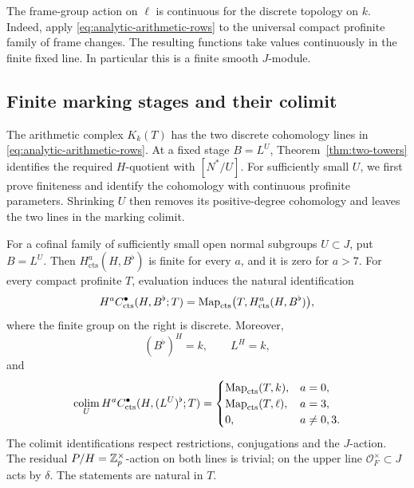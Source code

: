 The frame-group action on \(\ell\) is continuous for the discrete
topology on \(k\).  Indeed, apply
\eqref{eq:analytic-arithmetic-rows} to the universal compact
profinite family of frame changes.  The resulting functions take
values continuously in the finite fixed line.  In particular this
is a finite smooth \(J\)-module.

\subsection{Finite marking stages and their colimit}

The arithmetic complex $K_k(T)$ has the two discrete cohomology lines
in \eqref{eq:analytic-arithmetic-rows}.  At a fixed stage $B=L^U$,
Theorem~\ref{thm:two-towers} identifies the required $H$-quotient
with $[N^*/U]$.  For sufficiently small $U$, we first prove finiteness
and identify the cohomology with continuous profinite parameters.
Shrinking $U$ then removes its positive-degree cohomology and leaves
the two lines in the marking colimit.

\begin{theorem}
\label{thm:completed-calculation}
For a cofinal family of sufficiently small open normal subgroups
\(U\subset J\), put \(B=L^U\).
Then \(H^a_{\mathrm{cts}}(H,B^\flat)\) is finite for every \(a\),
and it is zero for \(a>7\).
For every compact profinite \(T\), evaluation induces the natural
identification
\begin{equation}
 H^aC^\bullet_{\mathrm{cts}}(H,B^\flat;T)
 =
 \operatorname{Map}_{\mathrm{cts}}
       \bigl(T,H^a_{\mathrm{cts}}(H,B^\flat)\bigr),
 \label{eq:analytic-finite-stage-parameters}
\end{equation}
where the finite group on the right is discrete.
Moreover,
\begin{equation}
 (B^\flat)^H=k,\qquad L^H=k,
 \label{eq:analytic-invariant-field}
\end{equation}
and
\begin{equation}
 \operatorname*{colim}_U H^aC^\bullet_{\mathrm{cts}}(H,(L^U)^\flat;T)
 =
 \begin{cases}
 \operatorname{Map}_{\mathrm{cts}}(T,k),&a=0,\\
 \operatorname{Map}_{\mathrm{cts}}(T,\ell),&a=3,\\
 0,&a\neq0,3.
 \end{cases}
 \label{eq:analytic-completed-colimit}
\end{equation}
The colimit identifications respect restrictions, conjugations and
the \(J\)-action.  The residual \(P/H=\mathbb Z_p^\times\)-action on both
lines is trivial; on the upper line
\(\mathcal O_F^\times\subset J\) acts by \(\delta\).
The statements are natural in \(T\).
\end{theorem}

